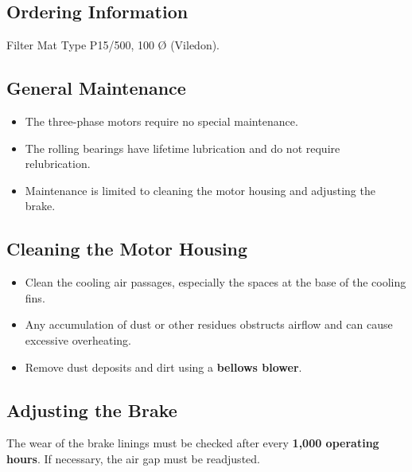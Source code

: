 \subsection*{Ordering Information}

Filter Mat Type P15/500, 100 Ø (Viledon).


\subsection*{General Maintenance}

\begin{itemize}
    \setlength{\itemsep}{0pt} \setlength{\parskip}{0pt}
    \item The three-phase motors require no special maintenance.
    \item The rolling bearings have lifetime lubrication and do not require \\relubrication.
    \item Maintenance is limited to cleaning the motor housing and adjusting the brake.
\end{itemize}

\subsection*{Cleaning the Motor Housing}

\begin{itemize}
    \setlength{\itemsep}{0pt} \setlength{\parskip}{0pt}
    \item Clean the cooling air passages, especially the spaces at the base of the cooling fins.
    \item Any accumulation of dust or other residues obstructs airflow  
          and can cause excessive overheating.
    \item Remove dust deposits and dirt using a \textbf{bellows blower}.
\end{itemize}

\subsection*{Adjusting the Brake}

The wear of the brake linings must be checked after every \textbf{1,000 operating hours}.  
If necessary, the air gap must be readjusted.

